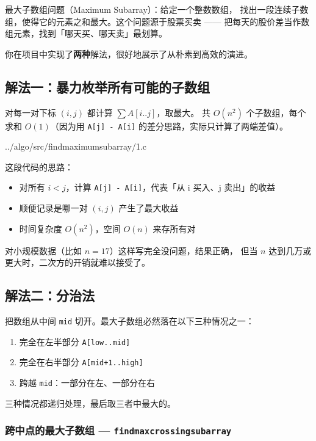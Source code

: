 最大子数组问题（Maximum Subarray）：给定一个整数数组，
找出一段连续子数组，使得它的元素之和最大。这个问题源于股票买卖
—— 把每天的股价差当作数组元素，找到「哪天买、哪天卖」最划算。

你在项目中实现了\textbf{两种}解法，很好地展示了从朴素到高效的演进。

\subsection{解法一：暴力枚举所有可能的子数组}

对每一对下标 \((i, j)\) 都计算 \(\sum A[i..j]\)，取最大。
共 \(O(n^2)\) 个子数组，每个求和 \(O(1)\)（因为用 \texttt{A[j] - A[i]}
的差分思路，实际只计算了两端差值）。


{../algo/src/findmaximumsubarray/1.c}

这段代码的思路：

\begin{itemize}
    \item 对所有 \(i < j\)，计算 \texttt{A[j] - A[i]}，代表「从 i 买入、j 卖出」的收益
    \item 顺便记录是哪一对 \((i, j)\) 产生了最大收益
    \item 时间复杂度 \(O(n^2)\)，空间 \(O(n)\) 来存所有对
\end{itemize}

对小规模数据（比如 \(n = 17\)）这样写完全没问题，结果正确，
但当 \(n\) 达到几万或更大时，二次方的开销就难以接受了。

\subsection{解法二：分治法}

把数组从中间 \texttt{mid} 切开。最大子数组必然落在以下三种情况之一：

\begin{enumerate}
    \item 完全在左半部分 \texttt{A[low..mid]}
    \item 完全在右半部分 \texttt{A[mid+1..high]}
    \item 跨越 \texttt{mid}：一部分在左、一部分在右
\end{enumerate}

三种情况都递归处理，最后取三者中最大的。

\subsubsection{跨中点的最大子数组 — \texttt{findmaxcrossingsubarray}}

